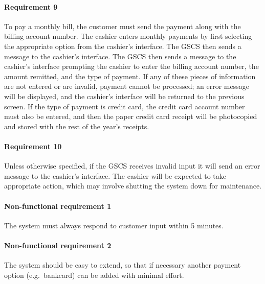\documentclass[11pt, a4paper]{article}
\begin{document}
    \begin{framed}
    \end{framed}

    \paragraph{Requirement 9} To pay a monthly bill, the customer must send
    the payment along with the billing account number. The cashier enters
    monthly payments by first selecting the appropriate option from the
    cashier's interface. The GSCS then sends a message to the cashier's
    interface. The GSCS then sends a message to the cashier's interface
    prompting the cashier to enter the billing account number, the amount
    remitted, and the type of payment. If any of these pieces of information
    are not entered or are invalid, payment cannot be processed; an error
    message will be displayed, and the cashier's interface will be returned
    to the previous screen. If the type of payment is credit card, the credit
    card account number must also be entered, and then the paper credit card
    receipt will be photocopied and stored with the rest of the year's receipts.

    \begin{framed}
    \end{framed}

    \paragraph{Requirement 10} Unless otherwise specified, if the GSCS receives
    invalid input it will send an error message to the cashier's interface.
    The cashier will be expected to take appropriate action, which may
    involve shutting the system down for maintenance.

    \begin{framed}
    \end{framed}

    \paragraph{Non-functional requirement 1} The system must always respond to
    customer input within 5 minutes.

    \paragraph{Non-functional requirement 2} The system should be easy to
    extend, so that if necessary another payment option (e.g.\ bankcard) can be
    added with minimal effort.
\end{document}
